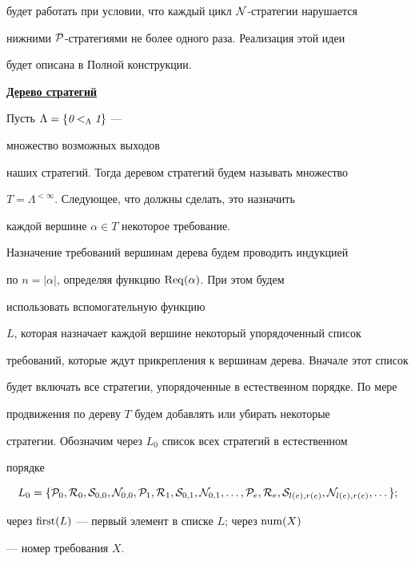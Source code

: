 будет работать при условии, что каждый цикл $\cal N$-стратегии нарушается


нижними $\cal P$-стратегиями не более одного раза. Реализация этой идеи


будет описана в Полной конструкции.





\underline{\bf Дерево стратегий}





Пусть $\Lambda=\{\text{\it 0}<_{\Lambda}\text{\it 1}\}$ ---


множество возможных выходов


наших стратегий. Тогда деревом стратегий будем называть множество


$T=\Lambda^{<\infty}$. Следующее, что должны сделать, это назначить


каждой вершине $\alpha\in T$ некоторое требование.


Назначение требований вершинам дерева будем проводить индукцией


по $n=|\alpha|$, определяя функцию $\operatorname{Req}(\alpha)$. При этом будем


использовать вспомогательную функцию


$L$, которая назначает каждой вершине некоторый упорядоченный список 


требований, которые ждут прикрепления к вершинам дерева. Вначале этот список


будет включать все стратегии, упорядоченные в естественном порядке. По мере 


продвижения по дереву $T$ будем добавлять или убирать некоторые 


стратегии. Обозначим через $L_0$ список всех стратегий в естественном


порядке


$$


L_0=\{\req{P}{0},\req{R}{0},\req{S}{{0,0}},\req{N}{{0,0}},\req{P}{1},


\req{R}{1},\req{S}{{0,1}},\req{N}{{0,1}},\dotsc,\req{P}{e},\req{R}{e},


\req{S}{{l(e),r(e)}},\req{N}{{l(e),r(e)}},\dotsc \};


$$ 


через $\operatorname{first} (L)$ --- первый элемент в списке $L$; через $\operatorname{num} (X)$


--- номер требования $X$.





